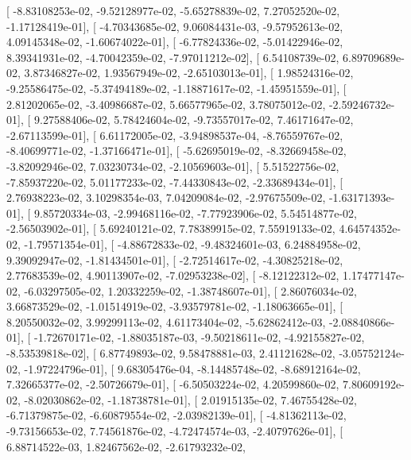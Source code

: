 \documentclass{article}
\begin{document}
       [ -8.83108253e-02,  -9.52128977e-02,  -5.65278839e-02,
          7.27052520e-02,  -1.17128419e-01],
       [ -4.70343685e-02,   9.06084431e-03,  -9.57952613e-02,
          4.09145348e-02,  -1.60674022e-01],
       [ -6.77824336e-02,  -5.01422946e-02,   8.39341931e-02,
         -4.70042359e-02,  -7.97011212e-02],
       [  6.54108739e-02,   6.89709689e-02,   3.87346827e-02,
          1.93567949e-02,  -2.65103013e-01],
       [  1.98524316e-02,  -9.25586475e-02,  -5.37494189e-02,
         -1.18871617e-02,  -1.45951559e-01],
       [  2.81202065e-02,  -3.40986687e-02,   5.66577965e-02,
          3.78075012e-02,  -2.59246732e-01],
       [  9.27588406e-02,   5.78424604e-02,  -9.73557017e-02,
          7.46171647e-02,  -2.67113599e-01],
       [  6.61172005e-02,  -3.94898537e-04,  -8.76559767e-02,
         -8.40699771e-02,  -1.37166471e-01],
       [ -5.62695019e-02,  -8.32669458e-02,  -3.82092946e-02,
          7.03230734e-02,  -2.10569603e-01],
       [  5.51522756e-02,  -7.85937220e-02,   5.01177233e-02,
         -7.44330843e-02,  -2.33689434e-01],
       [  2.76938223e-02,   3.10298354e-03,   7.04209084e-02,
         -2.97675509e-02,  -1.63171393e-01],
       [  9.85720334e-03,  -2.99468116e-02,  -7.77923906e-02,
          5.54514877e-02,  -2.56503902e-01],
       [  5.69240121e-02,   7.78389915e-02,   7.55919133e-02,
          4.64574352e-02,  -1.79571354e-01],
       [ -4.88672833e-02,  -9.48324601e-03,   6.24884958e-02,
          9.39092947e-02,  -1.81434501e-01],
       [ -2.72514617e-02,  -4.30825218e-02,   2.77683539e-02,
          4.90113907e-02,  -7.02953238e-02],
       [ -8.12122312e-02,   1.17477147e-02,  -6.03297505e-02,
          1.20332259e-02,  -1.38748607e-01],
       [  2.86076034e-02,   3.66873529e-02,  -1.01514919e-02,
         -3.93579781e-02,  -1.18063665e-01],
       [  8.20550032e-02,   3.99299113e-02,   4.61173404e-02,
         -5.62862412e-03,  -2.08840866e-01],
       [ -1.72670171e-02,  -1.88035187e-03,  -9.50218611e-02,
         -4.92155827e-02,  -8.53539818e-02],
       [  6.87749893e-02,   9.58478881e-03,   2.41121628e-02,
         -3.05752124e-02,  -1.97224796e-01],
       [  9.68305476e-04,  -8.14485748e-02,  -8.68912164e-02,
          7.32665377e-02,  -2.50726679e-01],
       [ -6.50503224e-02,   4.20599860e-02,   7.80609192e-02,
         -8.02030862e-02,  -1.18738781e-01],
       [  2.01915135e-02,   7.46755428e-02,  -6.71379875e-02,
         -6.60879554e-02,  -2.03982139e-01],
       [ -4.81362113e-02,  -9.73156653e-02,   7.74561876e-02,
         -4.72474574e-03,  -2.40797626e-01],
       [  6.88714522e-03,   1.82467562e-02,  -2.61793232e-02,
\end{document}
